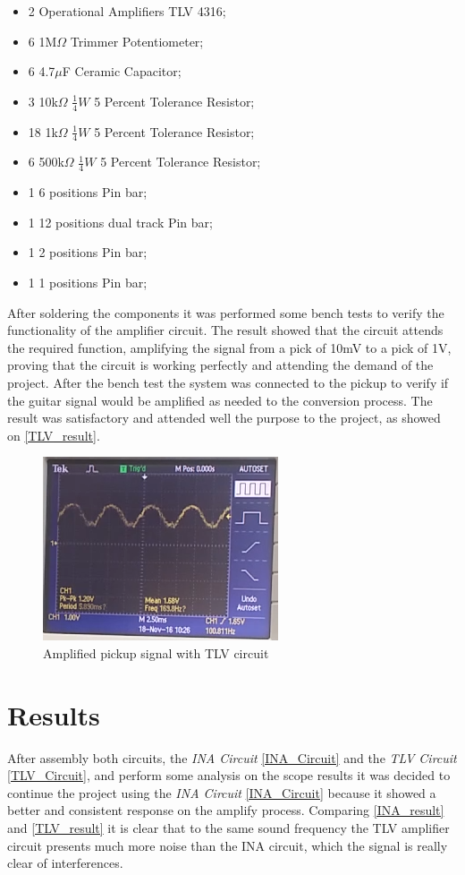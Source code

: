 \begin{itemize}
\item 2 Operational Amplifiers TLV 4316;
\item 6 1M$\Omega$ Trimmer Potentiometer;
\item 6 4.7$\mu$F Ceramic Capacitor;
\item 3 10k$\Omega$ $\frac{1}{4}W$ 5 Percent Tolerance Resistor;
\item 18 1k$\Omega$ $\frac{1}{4}W$ 5 Percent Tolerance Resistor;
\item 6 500k$\Omega$ $\frac{1}{4}W$ 5 Percent Tolerance Resistor;
\item 1 6 positions Pin bar;
\item 1 12 positions dual track Pin bar;
\item 1 2 positions Pin bar;
\item 1 1 positions Pin bar;
\end{itemize}

After soldering the components it was performed some bench tests to
verify the functionality of the amplifier circuit. The result showed that the
circuit attends the required function, amplifying the signal from a pick of 10mV
to a pick of 1V, proving that the circuit is working perfectly and attending the
demand of the project. After the bench test the system was connected to the pickup
to verify if the guitar signal would be amplified as needed to the conversion process.
The result was satisfactory and attended well the purpose to the project, as showed on \autoref{TLV_result}.

\begin{figure}[!htpb]
\centering
\caption{Amplified pickup signal with TLV circuit}
\label{TLV_result}
\includegraphics[scale=1]{images/TLV_result}
\end{figure}

\section{Results}
After assembly both circuits, the \textit{INA Circuit} \autoref{INA_Circuit} and the \textit{TLV Circuit} \autoref{TLV_Circuit},
and perform some analysis on the scope results it was decided to continue the project using the \textit{INA Circuit} \autoref{INA_Circuit}
because it showed a better and consistent response on the amplify process. Comparing \autoref{INA_result} and \autoref{TLV_result}
it is clear that to the same sound frequency the TLV amplifier circuit presents much more noise than the INA circuit, which the signal is really
clear of interferences.
